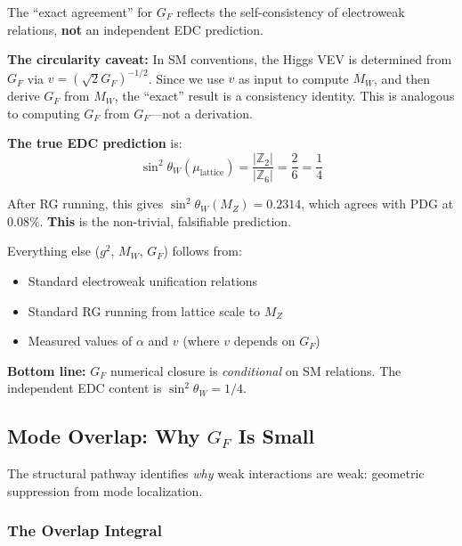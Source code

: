 \begin{remark}
\label{rem:ch11_firewall}
The ``exact agreement'' for $G_F$ reflects the self-consistency of electroweak
relations, \textbf{not} an independent EDC prediction.

\textbf{The circularity caveat:} In SM conventions, the Higgs VEV is determined
from $G_F$ via $v = (\sqrt{2}G_F)^{-1/2}$. Since we use $v$ as input to compute
$M_W$, and then derive $G_F$ from $M_W$, the ``exact'' result is a consistency
identity. This is analogous to computing $G_F$ from $G_F$---not a derivation.

\textbf{The true EDC prediction} is:
\begin{equation}
    \sin^2\theta_W(\mu_{\text{lattice}}) = \frac{|\mathbb{Z}_2|}{|\mathbb{Z}_6|}
    = \frac{2}{6} = \frac{1}{4}
    \label{eq:ch11_sin2_input}
\end{equation}

After RG running, this gives $\sin^2\theta_W(M_Z) = 0.2314$, which agrees with
PDG at 0.08\%. \textbf{This} is the non-trivial, falsifiable prediction.

Everything else ($g^2$, $M_W$, $G_F$) follows from:
\begin{itemize}[nosep]
    \item Standard electroweak unification relations \tagBL{}
    \item Standard RG running from lattice scale to $M_Z$ \tagBL{}
    \item Measured values of $\alpha$ and $v$ (where $v$ depends on $G_F$) \tagBL{}
\end{itemize}

\textbf{Bottom line:} $G_F$ numerical closure is \emph{conditional} on SM
relations. The independent EDC content is $\sin^2\theta_W = 1/4$.
\end{remark}

\subsection{\texorpdfstring{Mode Overlap: Why $G_F$ Is Small}{Mode Overlap: Why GF Is Small}}
\label{sec:ch11_overlap}

The structural pathway identifies \emph{why} weak interactions are weak:
geometric suppression from mode localization.

\subsubsection{The Overlap Integral}

